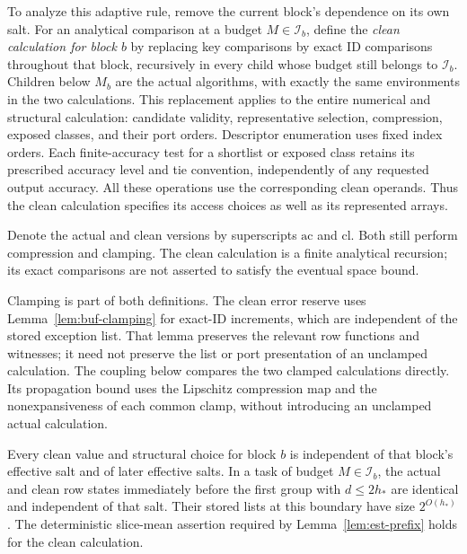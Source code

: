 To analyze this adaptive rule, remove the current block's dependence on its own salt. For an analytical comparison at a budget $M\in\mathcal I_b$, define the
\emph{clean calculation for block $b$} by replacing key comparisons by
exact ID comparisons throughout that block, recursively in every child
whose budget still belongs to $\mathcal I_b$.  Children below $M_b$ are
the actual algorithms, with exactly the same environments in the two
calculations.  This replacement applies to the entire numerical and
structural calculation: candidate validity, representative selection,
compression, exposed classes, and their port orders.  Descriptor
enumeration uses fixed index orders.  Each finite-accuracy test for a
shortlist or exposed class retains its prescribed accuracy level and
tie convention, independently of any requested output accuracy.  All
these operations use the corresponding clean operands.  Thus the clean
calculation specifies its access choices as well as its represented
arrays.

Denote the actual and clean versions by superscripts $\mathrm{ac}$ and
$\mathrm{cl}$.  Both still perform compression and clamping.  The clean
calculation is a finite analytical recursion; its exact comparisons are
not asserted to satisfy the eventual space bound.

Clamping is part of both definitions.  The clean error reserve uses
Lemma~\ref{lem:buf-clamping} for exact-ID increments, which are
independent of the stored exception list.  That lemma preserves the
relevant row functions and witnesses; it need not preserve the list or
port presentation of an unclamped calculation.  The coupling below
compares the two clamped calculations directly.  Its propagation bound
uses the Lipschitz compression map and the nonexpansiveness of each
common clamp, without introducing an unclamped actual calculation.

\begin{lemma}\label{lem:fp-clean}
Every clean value and structural choice for block $b$ is independent of
that block's effective salt and of later effective salts.  In a task of
budget $M\in\mathcal I_b$, the actual and clean row states immediately before
the first group with $d\le2h_*$ are identical and independent of that
salt.  Their stored lists at this boundary have size $2^{O(h_*)}$.
The deterministic slice-mean assertion required by
Lemma~\ref{lem:est-prefix} holds for the clean calculation.
\end{lemma}

